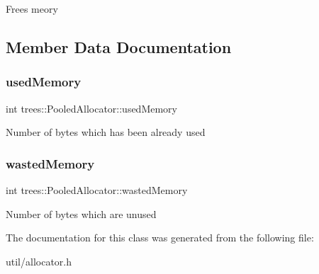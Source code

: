 Frees meory 

\subsection{Member Data Documentation}
\mbox{\label{classtrees_1_1_pooled_allocator_a1c1fcdab76bfdd6c99e91ede846b36c4}} 
\subsubsection{\texorpdfstring{used\+Memory}{usedMemory}}
{\footnotesize\ttfamily int trees\+::\+Pooled\+Allocator\+::used\+Memory}

Number of bytes which has been already used \mbox{\label{classtrees_1_1_pooled_allocator_a39f18ea897fadf1f81d006a853a4c0c0}} 
\subsubsection{\texorpdfstring{wasted\+Memory}{wastedMemory}}
{\footnotesize\ttfamily int trees\+::\+Pooled\+Allocator\+::wasted\+Memory}

Number of bytes which are unused 

The documentation for this class was generated from the following file\+:\begin{DoxyCompactItemize}
\item 
util/allocator.\+h\end{DoxyCompactItemize}
